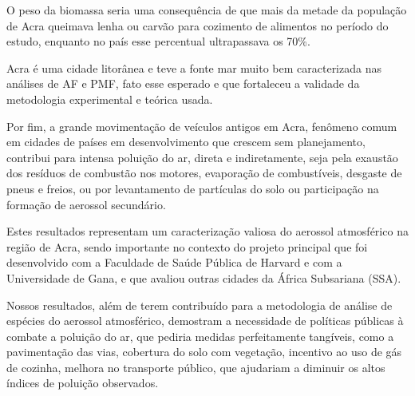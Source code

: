O peso da biomassa seria uma consequência de que mais da metade da população de Acra queimava lenha ou carvão para cozimento de alimentos no período do estudo, enquanto no país esse percentual ultrapassava os 70\%.

Acra é uma cidade litorânea e teve a fonte mar muito bem caracterizada nas análises de AF e PMF, fato esse esperado e que fortaleceu a validade da metodologia experimental e teórica usada.

Por fim, a grande movimentação de veículos antigos em Acra, fenômeno comum em cidades de países em desenvolvimento que crescem sem planejamento, contribui para intensa poluição do ar, direta e indiretamente, seja pela exaustão dos resíduos de combustão nos motores, evaporação de combustíveis, desgaste de pneus e freios, ou por levantamento de partículas do solo ou participação na formação de aerossol secundário. 

Estes resultados representam um caracterização valiosa do aerossol atmosférico na região de Acra, sendo importante no contexto do projeto principal que foi desenvolvido com a Faculdade de Saúde Pública de Harvard e com a Universidade de Gana, e que avaliou outras cidades da África Subsariana (SSA). 

Nossos resultados, além de terem contribuído para a metodologia de análise de espécies do aerossol atmosférico, demostram a necessidade de políticas públicas à combate a poluição do ar, que pediria medidas perfeitamente tangíveis, como a pavimentação das vias, cobertura do solo com vegetação, incentivo ao uso de gás de cozinha, melhora no transporte público, que ajudariam a diminuir os altos índices de poluição observados.
